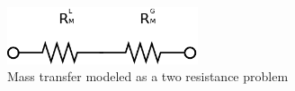 \label{fig:twoResist}
\begin{figure}[ht]
\begin{center}
    

\includegraphics[width=0.5\textwidth,height=0.5\textheight,keepaspectratio]{massTwoResist.png}
\caption{Mass transfer modeled as a two resistance problem}
\end{center}
\end{figure}